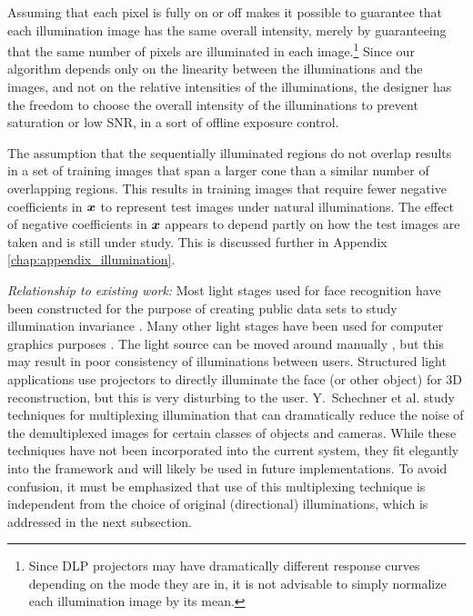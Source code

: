 Assuming that each pixel is fully on or off makes it possible to guarantee that each
illumination image has the same overall intensity, merely by guaranteeing that
the same number of pixels are illuminated in each image.\footnote{Since DLP
projectors may have dramatically different response curves depending on the
mode they are in, it is not advisable to simply normalize each illumination
image by its mean.} Since our algorithm depends only on the linearity between
the illuminations and the images, and not on the relative intensities of the
illuminations, the designer has the freedom to choose the overall intensity of
the illuminations to prevent saturation or low SNR, in a sort of offline
exposure control.

The assumption that the sequentially illuminated regions do not overlap results in a
set of training images that span a larger cone than a similar number of
overlapping regions.  This results in training images that require fewer
negative coefficients in ${\boldsymbol{x}}$ to represent test images under natural
illuminations.  The effect of negative coefficients in ${\boldsymbol{x}}$ appears to depend
partly on how the test images are taken and is still under study.
This is discussed further in Appendix \ref{chap:appendix_illumination}.

{\em Relationship to existing work:} Most light stages used for face
recognition have been constructed for the purpose of creating public data sets
to study illumination invariance \cite{Georghiades2001-PAMI, gross2010multi}.
Many other light stages have been used for computer graphics purposes
\cite{debevec2000acquiring, jones2005performance}.  The light source can be
moved around manually \cite{masselus2002free}, but this may result in poor
consistency of illuminations between users.  Structured light applications use
projectors to directly illuminate the face (or other object)
\cite{zhang2002rapid} for 3D reconstruction, but this is very disturbing to the
user.  Y.\ Schechner et al.\cite{schechner2007multiplexing} study techniques for
multiplexing illumination that can dramatically reduce the noise of the
demultiplexed images for certain classes of objects and cameras.  While these
techniques have not been incorporated into the current system, they fit
elegantly into the framework and will likely be used in future implementations.
To avoid confusion, it must be emphasized that use of this multiplexing
technique is independent from the choice of original (directional)
illuminations, which is addressed in the next subsection.

